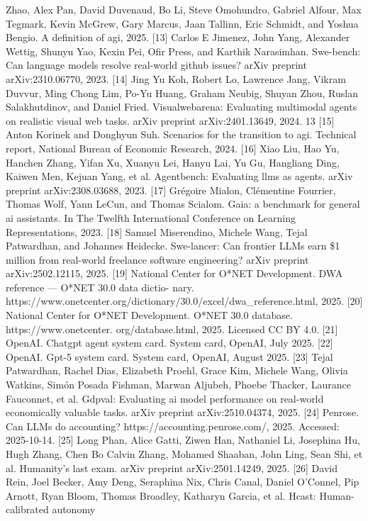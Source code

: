 Zhao, Alex Pan, David Duvenaud, Bo Li, Steve Omohundro, Gabriel Alfour, Max Tegmark,
Kevin McGrew, Gary Marcus, Jaan Tallinn, Eric Schmidt, and Yoshua Bengio. A definition of
agi, 2025.
[13] Carlos E Jimenez, John Yang, Alexander Wettig, Shunyu Yao, Kexin Pei, Ofir Press, and Karthik
Narasimhan. Swe-bench: Can language models resolve real-world github issues? arXiv preprint
arXiv:2310.06770, 2023.
[14] Jing Yu Koh, Robert Lo, Lawrence Jang, Vikram Duvvur, Ming Chong Lim, Po-Yu Huang,
Graham Neubig, Shuyan Zhou, Ruslan Salakhutdinov, and Daniel Fried. Visualwebarena:
Evaluating multimodal agents on realistic visual web tasks. arXiv preprint arXiv:2401.13649,
2024.
13
[15] Anton Korinek and Donghyun Suh. Scenarios for the transition to agi. Technical report, National
Bureau of Economic Research, 2024.
[16] Xiao Liu, Hao Yu, Hanchen Zhang, Yifan Xu, Xuanyu Lei, Hanyu Lai, Yu Gu, Hangliang
Ding, Kaiwen Men, Kejuan Yang, et al. Agentbench: Evaluating llms as agents. arXiv preprint
arXiv:2308.03688, 2023.
[17] Grégoire Mialon, Clémentine Fourrier, Thomas Wolf, Yann LeCun, and Thomas Scialom. Gaia:
a benchmark for general ai assistants. In The Twelfth International Conference on Learning
Representations, 2023.
[18] Samuel Miserendino, Michele Wang, Tejal Patwardhan, and Johannes Heidecke. Swe-lancer:
Can frontier LLMs earn \$1 million from real-world freelance software engineering? arXiv
preprint arXiv:2502.12115, 2025.
[19] National Center for O*NET Development.
DWA reference — O*NET 30.0 data dictio-
nary. https://www.onetcenter.org/dictionary/30.0/excel/dwa\_reference.html,
2025.
[20] National Center for O*NET Development. O*NET 30.0 database. https://www.onetcenter.
org/database.html, 2025. Licensed CC BY 4.0.
[21] OpenAI. Chatgpt agent system card. System card, OpenAI, July 2025.
[22] OpenAI. Gpt-5 system card. System card, OpenAI, August 2025.
[23] Tejal Patwardhan, Rachel Dias, Elizabeth Proehl, Grace Kim, Michele Wang, Olivia Watkins,
Simón Posada Fishman, Marwan Aljubeh, Phoebe Thacker, Laurance Fauconnet, et al. Gdpval:
Evaluating ai model performance on real-world economically valuable tasks. arXiv preprint
arXiv:2510.04374, 2025.
[24] Penrose. Can LLMs do accounting? https://accounting.penrose.com/, 2025. Accessed:
2025-10-14.
[25] Long Phan, Alice Gatti, Ziwen Han, Nathaniel Li, Josephina Hu, Hugh Zhang, Chen Bo Calvin
Zhang, Mohamed Shaaban, John Ling, Sean Shi, et al. Humanity’s last exam. arXiv preprint
arXiv:2501.14249, 2025.
[26] David Rein, Joel Becker, Amy Deng, Seraphina Nix, Chris Canal, Daniel O’Connel, Pip Arnott,
Ryan Bloom, Thomas Broadley, Katharyn Garcia, et al. Hcast: Human-calibrated autonomy
